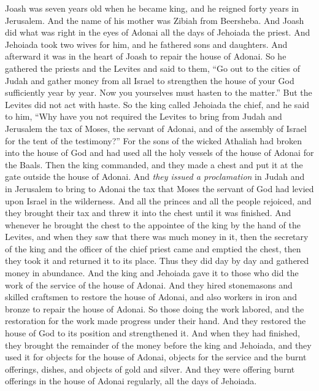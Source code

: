 \begin{biblechapter} %
 Joash was seven years old when he became king, and he reigned forty years in Jerusalem. And the name of his mother was Zibiah from Beersheba.
\verse And Joash did what was right in the eyes of Adonai all the days of Jehoiada the priest.
\verse And Jehoiada took two wives for him, and he fathered sons and daughters.
\verse And afterward it was in the heart of Joash to repair the house of Adonai.
\verse So he gathered the priests and the Levites and said to them, “Go out to the cities of Judah and gather money from all Israel to strengthen the house of your God sufficiently year by year. Now you yourselves must hasten to the matter.” But the Levites did not act with haste.
\verse So the king called Jehoiada the chief, and he said to him, “Why have you not required the Levites to bring from Judah and Jerusalem the tax of Moses, the servant of Adonai, and of the assembly of Israel for the tent of the testimony?”
\verse For the sons of the wicked Athaliah had broken into the house of God and had used all the holy vessels of the house of Adonai for the Baals.
\verse Then the king commanded, and they made a chest and put it at the gate outside the house of Adonai.
\verse And \textit{they issued a proclamation} in Judah and in Jerusalem to bring to Adonai the tax that Moses the servant of God had levied upon Israel in the wilderness.
\verse And all the princes and all the people rejoiced, and they brought their tax and threw it into the chest until it was finished.
\verse And whenever he brought the chest to the appointee of the king by the hand of the Levites, and when they saw that there was much money in it, then the secretary of the king and the officer of the chief priest came and emptied the chest, then they took it and returned it to its place. Thus they did day by day and gathered money in abundance.
\verse And the king and Jehoiada gave it to those who did the work of the service of the house of Adonai. And they hired stonemasons and skilled craftsmen to restore the house of Adonai, and also workers in iron and bronze to repair the house of Adonai.
\verse So those doing the work labored, and the restoration for the work made progress under their hand. And they restored the house of God to its position and strengthened it.
\verse And when they had finished, they brought the remainder of the money before the king and Jehoiada, and they used it for objects for the house of Adonai, objects for the service and the burnt offerings, dishes, and objects of gold and silver. And they were offering burnt offerings in the house of Adonai regularly, all the days of Jehoiada.

\end{biblechapter}
